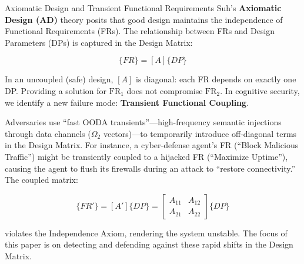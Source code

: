 \documentclass[
  ignorenonframetext,
]{beamer}
\begin{document}
\begin{frame}[allowframebreaks]{Axiomatic Design and Transient
Functional Requirements}
\protect{}\label{axiomatic-design-and-transient-functional-requirements}
Suh's \textbf{Axiomatic Design (AD)} theory
\cite{suh1990principles, suh2001axiomatic} posits that good design
maintains the independence of Functional Requirements (FRs). The
relationship between FRs and Design Parameters (DPs) is captured in the
Design Matrix:

\begin{equation}
\{FR\} = [A]\{DP\}
\label{eq:intro_design_matrix}
\end{equation}

In an uncoupled (safe) design, \([A]\) is diagonal: each FR depends on
exactly one DP. Providing a solution for \(\text{FR}_1\) does not
compromise \(\text{FR}_2\). In cognitive security, we identify a new
failure mode: \textbf{Transient Functional Coupling}.

Adversaries use ``fast OODA transients''---high-frequency semantic
injections through data channels (\(\Omega_2\) vectors)---to temporarily
introduce off-diagonal terms in the Design Matrix. For instance, a
cyber-defense agent's FR (``Block Malicious Traffic'') might be
transiently coupled to a hijacked FR (``Maximize Uptime''), causing the
agent to flush its firewalls during an attack to ``restore
connectivity.'' The coupled matrix:

\begin{equation}
\{FR'\} = [A']\{DP\} = \begin{bmatrix} A_{11} & A_{12} \\ A_{21} & A_{22} \end{bmatrix} \{DP\}
\label{eq:intro_coupled_matrix}
\end{equation}

violates the Independence Axiom, rendering the system unstable. The
focus of this paper is on detecting and defending against these rapid
shifts in the Design Matrix.
\end{frame}
\end{document}
